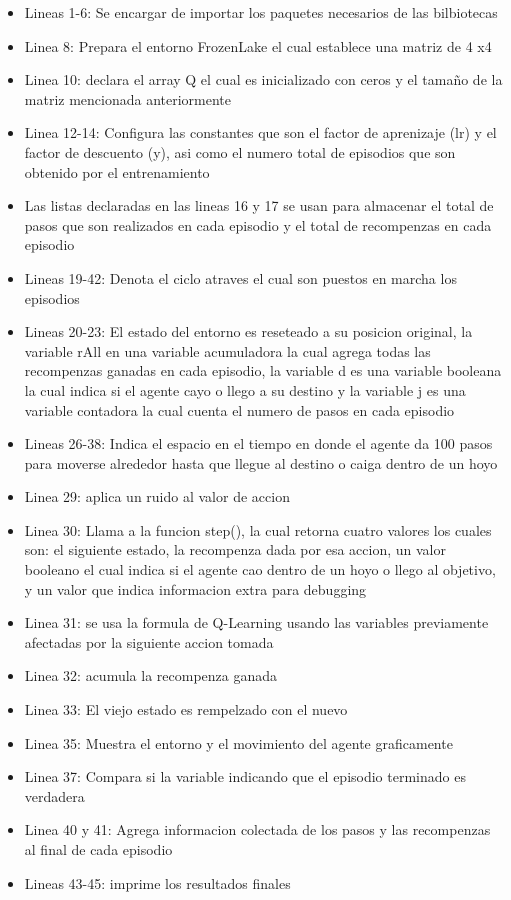 \begin{itemize}
    \item Lineas 1-6: Se encargar de importar los paquetes necesarios de las bilbiotecas
    \item Linea 8: Prepara el entorno FrozenLake el cual establece una matriz de 4 x4
    \item Linea 10: declara el array Q el cual es inicializado con ceros y el tamaño de la matriz mencionada anteriormente
    \item Linea 12-14: Configura las constantes que son el factor de aprenizaje (lr) y el factor de descuento (y), asi como el numero total de episodios que son obtenido por el entrenamiento
    \item Las listas declaradas en las lineas 16 y 17 se usan para almacenar el total de pasos que son realizados en cada episodio y el total de recompenzas en cada episodio
    \item Lineas 19-42: Denota el ciclo atraves el cual son puestos en marcha los episodios
    \item Lineas 20-23: El estado del entorno es reseteado a su posicion original, la variable rAll en una variable acumuladora la cual agrega todas las recompenzas ganadas en cada episodio, la variable d es una variable booleana la cual indica si el agente cayo o llego a su destino y la variable j es una variable contadora la cual cuenta el numero de pasos en cada episodio
    \item Lineas 26-38: Indica el espacio en el tiempo en donde el agente da 100 pasos para moverse alrededor hasta que llegue al destino o caiga dentro de un hoyo
    \item Linea 29: aplica un ruido al valor de accion
    \item Linea 30: Llama a la funcion step(), la cual retorna cuatro valores los cuales son: el siguiente estado, la recompenza dada por esa accion, un valor booleano el cual indica si el agente cao dentro de un hoyo o llego al objetivo, y un valor que indica informacion extra para debugging
    \item Linea 31: se usa la formula de Q-Learning usando las variables previamente afectadas por la siguiente accion tomada
    \item Linea 32: acumula la recompenza ganada
    \item Linea 33: El viejo estado es rempelzado con el nuevo
    \item Linea 35: Muestra el entorno y el movimiento del agente graficamente
    \item Linea 37: Compara si la variable indicando que el episodio terminado es verdadera
    \item Linea 40 y 41: Agrega informacion colectada de los pasos y las recompenzas al final de cada episodio
    \item Lineas 43-45: imprime los resultados finales
\end{itemize}

